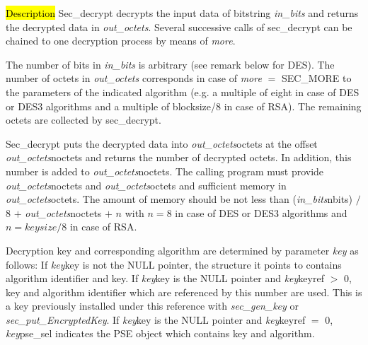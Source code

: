 


\hl{Description}
Sec\_decrypt decrypts the input data of bitstring {\em in\_bits} and returns the decrypted data
in {\em out\_octets}. Several successive calls of sec\_decrypt can be chained
to one decryption process by means of {\em more}.
          
The number of bits in {\em in\_bits} is arbitrary (see remark below for DES). The number of octets in {\em out\_octets}
corresponds in case of {\em more} $=$ SEC\_MORE to the parameters of the indicated algorithm
(e.g. a multiple of eight in case of DES or DES3 algorithms and a multiple of blocksize/8
in case of RSA). The remaining octets are collected by sec\_decrypt.

Sec\_decrypt puts the decrypted data into {\em out\_octets}\pf octets at the offset
{\em out\_octets}\pf noctets and returns the number of decrypted octets. In addition, this number is added 
to {\em out\_octets}\pf noctets.
The calling program must provide {\em out\_octets}\pf noctets and {\em out\_octets}\pf octets and sufficient
memory in {\em out\_octets}\pf octets. 
The amount of memory should be not less than
({\em in\_bits}\pf nbits) $/$ 8 $+$ {\em out\_octets}\pf noctets $+$ $n$ with $n = 8$ 
in case of DES or DES3 algorithms and $n = keysize / 8$ in case of RSA.

Decryption key and corresponding algorithm are determined by parameter {\em key} as follows:
\be
\m If {\em key}\pf key is not the NULL pointer, the structure it points to
   contains algorithm identifier and key.
\m If {\em key}\pf key is the NULL pointer and {\em key}\pf keyref $>$ 0,
   key and algorithm identifier which are referenced by this number are used. This is a key
   previously installed under this reference with {\em sec\_gen\_key} or 
   {\em sec\_put\_EncryptedKey}.
\m If {\em key}\pf key is the NULL pointer and {\em key}\pf keyref $=$ 0,
   {\em key}\pf pse\_sel indicates the PSE object which contains key and algorithm.
\ee

